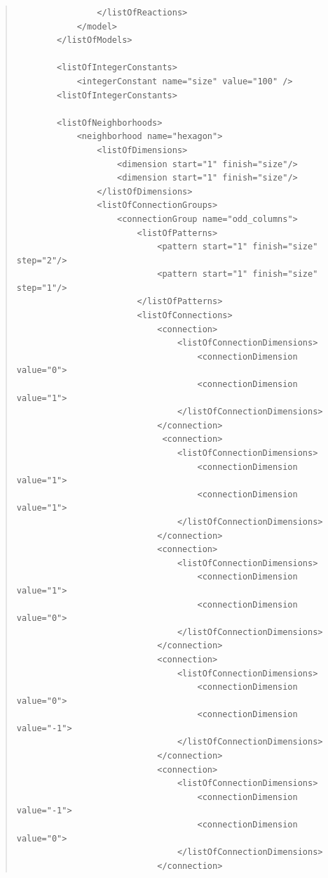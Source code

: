 \documentclass[10pt]{article}
\begin{document}
\begin{quote}
\begin{small}
\begin{verbatim}
                </listOfReactions>
            </model>
        </listOfModels>

        <listOfIntegerConstants>
            <integerConstant name="size" value="100" />
        <listOfIntegerConstants>

        <listOfNeighborhoods>
            <neighborhood name="hexagon">
                <listOfDimensions>
                    <dimension start="1" finish="size"/>
                    <dimension start="1" finish="size"/>
                </listOfDimensions>
                <listOfConnectionGroups>
                    <connectionGroup name="odd_columns">
                        <listOfPatterns>
                            <pattern start="1" finish="size" step="2"/>
                            <pattern start="1" finish="size" step="1"/>
                        </listOfPatterns>
                        <listOfConnections>
                            <connection>
                                <listOfConnectionDimensions>
                                    <connectionDimension value="0">
                                    <connectionDimension value="1">
                                </listOfConnectionDimensions>
                            </connection>
                             <connection>
                                <listOfConnectionDimensions>
                                    <connectionDimension value="1">
                                    <connectionDimension value="1">
                                </listOfConnectionDimensions>
                            </connection>
                            <connection>
                                <listOfConnectionDimensions>
                                    <connectionDimension value="1">
                                    <connectionDimension value="0">
                                </listOfConnectionDimensions>
                            </connection>
                            <connection>
                                <listOfConnectionDimensions>
                                    <connectionDimension value="0">
                                    <connectionDimension value="-1">
                                </listOfConnectionDimensions>
                            </connection>
                            <connection>
                                <listOfConnectionDimensions>
                                    <connectionDimension value="-1">
                                    <connectionDimension value="0">
                                </listOfConnectionDimensions>
                            </connection>

\end{verbatim}
\end{small}
\end{quote}
\end{document}
